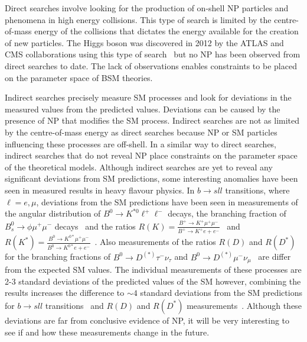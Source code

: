 Direct searches involve looking for the production of on-shell NP particles and phenomena in high energy collisions. 
This type of search is limited by the centre-of-mass energy of the collisions that dictates the energy available for the creation of new particles. 
The Higgs boson was discovered in 2012 by the ATLAS and CMS collaborations using this type of search~\cite{Chatrchyan:2012xdj,Aad:2012tfa} but no NP has been observed from direct searches to date. The lack of observations enables constraints to be placed on the parameter space of BSM theories.


Indirect searches precisely measure SM processes and look for deviations in the measured values from the predicted values. Deviations can be caused by the presence of NP that modifies the SM process. 
Indirect searches are not as limited by the centre-of-mass energy as direct searches because NP or SM particles influencing these processes are off-shell. %
In a similar way to direct searches, indirect searches that do not reveal NP place constraints on the parameter space of the theoretical models. Although indirect searches are yet to reveal any significant deviations from SM predictions, some interesting anomalies have been seen in measured results in heavy flavour physics. 
In $b \to sll$ transitions, where $\ell = e, \mu$,  deviations from the SM predictions have been seen in measurements of the angular distribution of $B^0 \to K^{*0} \ell^{+} \ell^{-}$ decays\cite{PhysRevLett.118.111801,Aaij:2014pli, Aaij:2015oid. ATLAS-CONF-2017-023,CMS-PAS-BPH-15-008}, the branching fraction of $B^{0}_{s} \to \phi  \mu^{+} \mu^{-}$ decays~\cite{Aaij:2015esa} and the ratios $R(K) = \frac{B^+ \to K^+ \mu^{+} \mu^{-}}{B^+ \to K^+ e{+} e^{-}}$~\cite{PhysRevLett.113.151601} and $R(K^{*}) = \frac{B^0 \to K^{0*} \mu^{+} \mu^{-}}{B^0 \to K^{0*} e{+} e^{-}}$~\cite{R_K_star}. Also measurements of the ratios $R(D)$ and $R(D^*)$ for the branching fractions of $B^0 \to D^{(*)} \tau^{-} \nu_{\tau}$ and $B^0 \to D^{(*)} \mu^{-} \nu_{\mu}$~\cite{Aaij:2015yra,Huschle:2015rga, Lees:2012xj,Lees:2013uzd, Sato:2016svk,} are differ from the expected SM values. 
The individual measurements of these processes are 2-3 standard deviations of the predicted values of the SM however, combining the results increases the difference to $\sim 4$ standard deviations from the SM predictions for $b \to sll$ transitions~\cite{Altmannshofer:2017yso,Capdevila:2017bsm} and $R(D)$ and $R(D^*)$ measurements~\cite{Amhis:2016xyh}. 
Although these deviations are far from conclusive evidence of NP, it will be very interesting to see if and how these measurements change in the future.


